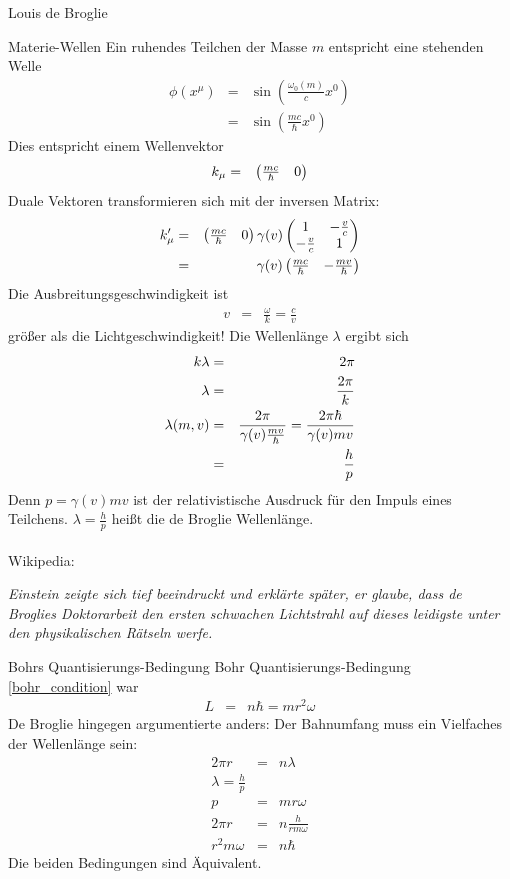 \begin{chapter}{\titlestr}
\begin{section}{Louis de Broglie}
\begin{subsection}{Materie-Wellen}
Ein ruhendes Teilchen der Masse $m$ entspricht eine stehenden Welle
\begin{eqnarray*}
\phi(x^\mu) &=& \sin\left(\frac{\omega_0(m)}{c}x^0\right)\\
 &=& \sin\left(\frac{mc}{\hbar}x^0\right)
\end{eqnarray*}
Dies entspricht einem Wellenvektor
\begin{eqnarray*}
k_\mu &=& \begin{pmatrix}\frac{mc}{\hbar} & 0\end{pmatrix}
\end{eqnarray*}
Duale Vektoren transformieren sich mit der inversen Matrix:
\begin{eqnarray*}
k^\prime_\mu &=& \begin{pmatrix}\frac{mc}{\hbar} & 0\end{pmatrix}\gamma(v)
\begin{pmatrix}1 & -\frac{v}{c}\\
 -\frac{v}{c} &1
\end{pmatrix}\\
&=& \gamma(v)\begin{pmatrix}\frac{mc}{\hbar} & -\frac{mv}{\hbar}\end{pmatrix}
\end{eqnarray*}
Die Ausbreitungsgeschwindigkeit ist
\begin{eqnarray*}
v &=& \frac{\omega}{k} = \frac{c}{v}
\end{eqnarray*}
größer als die Lichtgeschwindigkeit! Die Wellenlänge $\lambda$ ergibt sich
\begin{eqnarray}
\label{de_broglie_wavelenght}
k\lambda &=& 2\pi\cr
\lambda &=& \frac{2\pi}{k}\cr
\lambda(m,v) &=& \frac{2\pi}{\gamma(v)\frac{mv}{\hbar}}=\frac{2\pi\hbar}{\gamma(v)mv}\cr
&=&\frac{h}{p}
\end{eqnarray}
Denn $p=\gamma(v)mv$ ist der relativistische Ausdruck für den Impuls eines Teilchens.
$\lambda=\frac{h}{p}$ heißt die de Broglie Wellenlänge.
\\ \\
Wikipedia:

\textit{Einstein zeigte sich tief beeindruckt und erklärte später, er glaube, dass de Broglies Doktorarbeit den ersten schwachen Lichtstrahl auf dieses leidigste unter den physikalischen Rätseln werfe.
}
\end{subsection}

\begin{subsection}{Bohrs Quantisierungs-Bedingung}
Bohr Quantisierungs-Bedingung \ref{bohr_condition} war
\begin{eqnarray*}
L &=& n\hbar = mr^2\omega
\end{eqnarray*}
De Broglie hingegen argumentierte anders: Der Bahnumfang muss ein Vielfaches der Wellenlänge sein:
\begin{eqnarray*}
2\pi r &=& n\lambda\\
\lambda=\frac{h}{p}\\
p &=& mr\omega\\
2\pi r &=& n\frac{h}{rm\omega}\\
r^2m\omega &=& n\hbar
\end{eqnarray*}
Die beiden Bedingungen sind Äquivalent.
\end{subsection}


\end{section}
\end{chapter}
